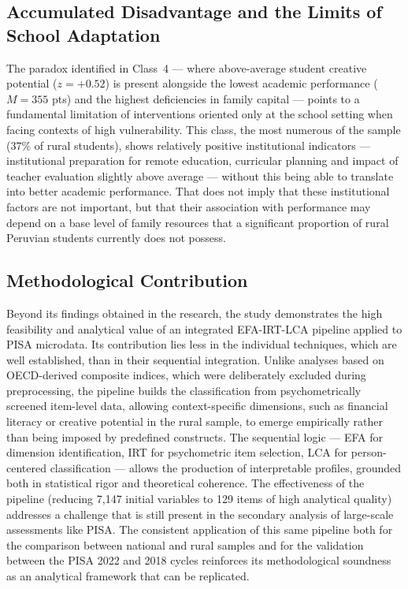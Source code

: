 \documentclass[runningheads]{llncs}
\begin{document}
\subsection{Accumulated Disadvantage and the Limits of School
Adaptation}

The paradox identified in Class~4 --- where above-average student
creative potential (\(z = +0.52\)) is present alongside the
lowest academic performance (\(M = 355\) pts) and the highest
deficiencies in family capital --- points to a fundamental
limitation of interventions oriented only at the school setting
when facing contexts of high vulnerability. This class, the most
numerous of the sample (37\% of rural students), shows relatively
positive institutional indicators --- institutional preparation
for remote education, curricular planning and impact of teacher
evaluation slightly above average --- without this being able to
translate into better academic performance. That does not imply
that these institutional factors are not important, but that
their association with performance may depend on a base level of
family resources that a significant proportion of rural Peruvian
students currently does not possess.

\subsection{Methodological Contribution}

Beyond its findings obtained in the research, the study
demonstrates the high feasibility and analytical value of an
integrated EFA-IRT-LCA pipeline applied to PISA microdata. Its
contribution lies less in the individual techniques, which are
well established, than in their sequential integration. Unlike
analyses based on OECD-derived composite indices, which were
deliberately excluded during preprocessing, the pipeline builds
the classification from psychometrically screened item-level
data, allowing context-specific dimensions, such as financial
literacy or creative potential in the rural sample, to emerge
empirically rather than being imposed by predefined constructs.
The sequential logic --- EFA for dimension identification, IRT
for psychometric item selection, LCA for person-centered
classification --- allows the production of interpretable
profiles, grounded both in statistical rigor and theoretical
coherence. The effectiveness of the pipeline (reducing 7,147
initial variables to 129 items of high analytical quality)
addresses a challenge that is still present in the secondary
analysis of large-scale assessments like PISA. The consistent
application of this same pipeline both for the comparison between
national and rural samples and for the validation between the
PISA 2022 and 2018 cycles reinforces its methodological soundness
as an analytical framework that can be replicated.
\end{document}
